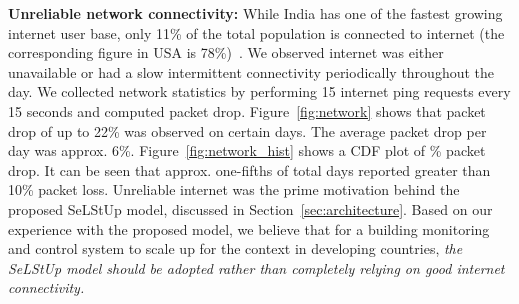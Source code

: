 \documentclass[10pt]{sensys-proc}
\newcommand{\figref}[1]{Figure~\ref{#1}}
\newcommand{\secref}[1]{Section~\ref{#1}}
\newcommand{\paradigms}{Sense-Local Store-Upload~}
\newcommand{\selstups}{SeLStUp }
\begin{document}
\noindent \textbf{Unreliable network connectivity:} While India has one of the fastest growing internet user base, only 11\% of the total population is connected to internet (the corresponding figure in USA is 78\%)~\cite{meyer}. %
We observed internet was either unavailable or had a slow intermittent connectivity periodically throughout the day. We collected network statistics by performing 15 internet ping requests every 15 seconds and computed packet drop. \figref{fig:network} shows that packet drop of up to 22\% was observed on certain days. The average packet drop per day was approx. 6\%. \figref{fig:network_hist} shows a CDF plot of \% packet drop. It can be seen that approx. one-fifths of total days reported greater than 10\% packet loss. Unreliable internet was the prime motivation behind the proposed \selstups model, discussed in \secref{sec:architecture}. Based on our experience with the proposed model, we believe that for a building monitoring and control system to scale up for the context in developing countries, \emph{the \selstups model should be adopted rather than completely relying on good internet connectivity.} %
%
\end{document}
